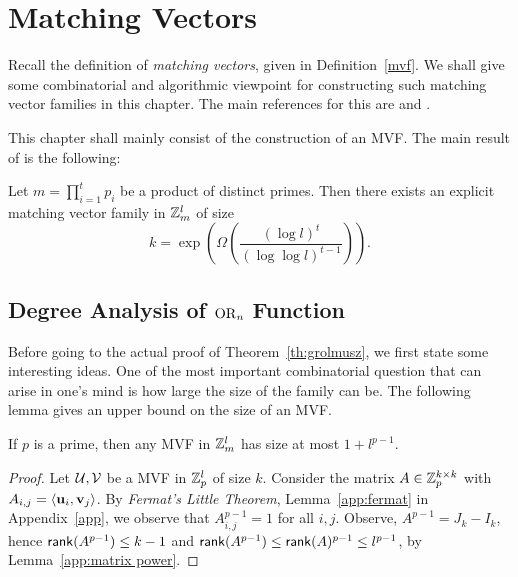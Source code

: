 \chapter{Matching Vectors}
Recall the definition of \emph{matching vectors}, given in Definition~\ref{mvf}. We shall give some combinatorial and algorithmic viewpoint for constructing such matching vector families in this chapter. The main references for this are \cite{bbr1992} and \cite{Grolmusz2000}.

This chapter shall mainly consist of the construction of an MVF. The main result of \cite{Grolmusz2000} is the following:

\begin{blackbox}
     \begin{theorem}[Grolmusz]\label{th:grolmusz}
    Let
    $m = \prod_{i=1}^t p_i$
    be a product of distinct primes. Then there exists an explicit matching vector family in $\mathbb{Z}_m^l$ of size
    \[
    k = \exp\left(
        \Omega\left(
            \frac{(\log l)^t}{(\log\log l)^{t-1}}
        \right)
    \right).
    \]
\end{theorem}
\end{blackbox}

\section{Degree Analysis of $\operatorname{OR}_n$ Function}


Before going to the actual proof of Theorem~\ref{th:grolmusz}, we first state some interesting ideas. One of the most important combinatorial question that can arise in one's mind is how large the size of the family can be. The following lemma gives an upper bound on the size of an MVF.

\begin{greybox}
    \begin{lemma}
        If $p$ is a prime, then any MVF in $\mathbb{Z}_m^l$ has size at most $1 + l^{p-1}$. 
    \end{lemma}
\end{greybox}
\begin{proof}
    Let $\mathcal{U}, \mathcal{V}$ be a MVF in $\mathbb{Z}_p^l$ of size $k$. Consider the matrix $A\in\mathbb{Z}_p^{k\times k}$ with $A_{i,j} = \langle \mathbf{u}_i, \mathbf{v}_j \rangle$. By \emph{Fermat's Little Theorem}, Lemma~\ref{app:fermat} in Appendix~\ref{app}, we observe that $A_{i,j}^{p-1} = 1$ for all $i,j$. Observe, $A^{p-1} = J_k - I_k$, hence $\mathsf{rank}(A^{p-1})\leq k-1$ and $\mathsf{rank}(A^{p-1}) \leq \mathsf{rank}(A)^{p-1} \leq l^{p-1}$, by Lemma~\ref{app:matrix power}. 
\end{proof}


